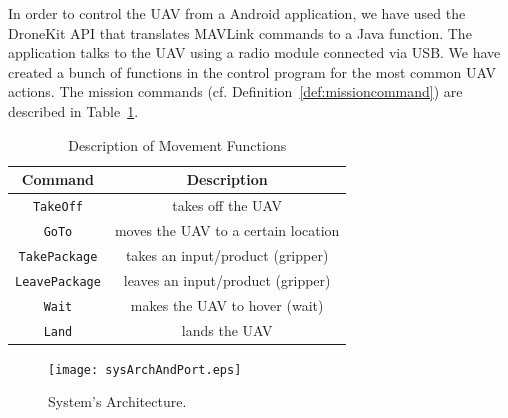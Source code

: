 \documentclass[12pt]{article}
\begin{document}
In order to control the UAV from a Android application, we have used the DroneKit API that translates MAVLink commands to a Java function. The application talks to the UAV using a radio module connected via USB. We have created a bunch of functions in the control program for the most common UAV actions. The mission commands (cf. Definition~\ref{def:missioncommand}) are described in Table~\ref{table:movfunc}.
%


\begin{table}[H]\caption{Description of Movement Functions}
\centering
\begin{tabular}{|c|c|}
\hline
\textbf{Command} & \textbf{Description} \\ \hline
\texttt{TakeOff}               &        takes off the UAV                                \\ \hline
\texttt{GoTo}      &                    moves the UAV to a certain location  \\ \hline
\texttt{TakePackage}               &    takes an input/product (gripper)                  \\ \hline
\texttt{LeavePackage}               &   leaves an input/product (gripper)                   \\ \hline
\texttt{Wait}                &          makes the UAV to hover (wait)            \\ \hline
\texttt{Land}                &          lands the UAV                                                  \\ \hline
\end{tabular}
\label{table:movfunc}
\end{table}

\begin{figure}[H]
	\centering
	\texttt{[image: sysArchAndPort.eps]}
	\caption{System's Architecture.\label{fig:sysArch}}
\end{figure}
\end{document}
